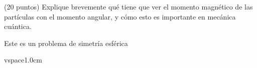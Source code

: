 \question [1] (20 puntos) Explique brevemente qué tiene que ver el momento magnético de las partículas con el momento angular, y cómo esto es importante en mecánica cuántica.

\begin{solution}

Este es un problema de simetría esférica 


\end{solution}

vspace{1.0cm}